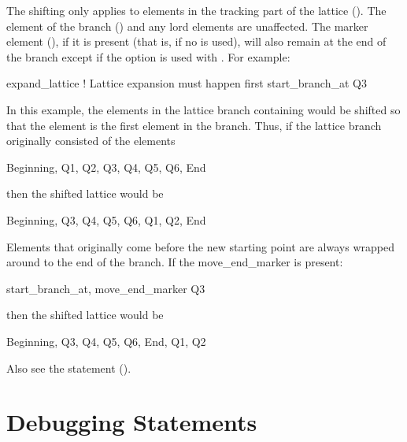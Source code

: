 {{{{{The shifting only applies to elements in the tracking part of the lattice (). The
 element of the branch () and any lord elements are unaffected. The
 marker element (), if it is present (that is, if no
 is used), will also remain at the end of the branch except if the
 option is used with . For example:
\begin{example}
  expand_lattice           ! Lattice expansion must happen first
  start_branch_at Q3
\end{example}
In this example, the elements in the lattice branch containing  would be shifted so that the
 element is the first element in the branch. Thus, if the lattice branch originally consisted
of the elements
\begin{example}
  Beginning, Q1,  Q2,  Q3,  Q4,  Q5,  Q6, End
\end{example}
then the shifted lattice would be
\begin{example}
  Beginning, Q3,  Q4,  Q5,  Q6, Q1,  Q2, End
\end{example}
Elements that originally come before the new starting point are always wrapped around to the end of
the branch. If the move_end_marker is present:
\begin{example}
  start_branch_at, move_end_marker Q3
\end{example}
then the shifted lattice would be
\begin{example}
  Beginning, Q3,  Q4,  Q5,  Q6, End, Q1,  Q2
\end{example}

Also see the  statement ().

%

\section{Debugging Statements}
\label{s:debug}

}}}}}
